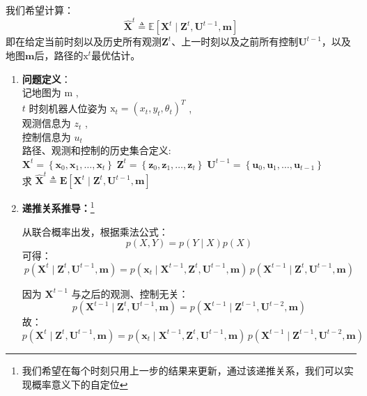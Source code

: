 \documentclass[../main.tex]{subfiles}
\begin{document}
\begin{enumerate}
\begin{enumerate}
            我们希望计算：
        \[
        \widehat{\mathbf{X}}^{t} \triangleq \mathbb{E}\left[ \mathbf{X}^{t} \mid \mathbf{Z}^{t}, \mathbf{U}^{t-1}, \mathbf{m} \right]
        \]
        即在给定当前时刻以及历史所有观测$\mathbf{Z}^{t}$、上一时刻以及之前所有控制$\mathbf{U}^{t-1}$，以及地图$\mathbf{m}$后，路径的$\mathrm{x}^t$最优估计。
        {\small\kaishu 
        \begin{enumerate}
        \item \textbf{问题定义}：\\
        记地图为 \( \mathrm{m} \) ,\\
\( t \) 时刻机器人位姿为 \( \mathrm{x}_{t} = {\left( {x}_{t},{y}_{t},{\theta }_{t}\right) }^{T} \) ,\\观测信息为 \( {z}_{t} \) ,\\控制信息为 \( {u}_{t} \)\\路径、观测和控制的历史集合定义:
\( {\mathbf{X}}^{t} = \left\{  {{\mathbf{x}}_{0},{\mathbf{x}}_{1},\ldots ,{\mathbf{x}}_{t}}\right\}  \;{\mathbf{Z}}^{t} = \left\{  {{\mathbf{z}}_{0},{\mathbf{z}}_{1},\ldots ,{\mathbf{z}}_{t}}\right\}  \;{\mathbf{U}}^{t - 1} = \left\{  {{\mathbf{u}}_{0},{\mathbf{u}}_{1},\ldots ,{\mathbf{u}}_{t - 1}}\right\} \)
\\求 \( {\widehat{\mathbf{X}}}^{t} \triangleq  \mathbf{E}\left\lbrack  {{\mathbf{X}}^{t} \mid  {\mathbf{Z}}^{t},{\mathbf{U}}^{t - 1},\mathbf{m}}\right\rbrack \)
        \item \textbf{递推关系推导：}\footnote{我们希望在每个时刻只用上一步的结果来更新，通过该递推关系，我们可以实现概率意义下的自定位}
        
        从联合概率出发，根据乘法公式：
        \[
        p(X,Y) = p(Y \mid X) p(X)
        \]
        可得：
        \[
        p(\mathbf{X}^{t} \mid \mathbf{Z}^{t}, \mathbf{U}^{t-1}, \mathbf{m})
        = p(\mathbf{x}_t \mid \mathbf{X}^{t-1}, \mathbf{Z}^{t}, \mathbf{U}^{t-1}, \mathbf{m})
        \, p(\mathbf{X}^{t-1} \mid \mathbf{Z}^{t}, \mathbf{U}^{t-1}, \mathbf{m})
        \]
        
        因为 \( \mathbf{X}^{t-1} \) 与之后的观测、控制无关：
        \[
        p(\mathbf{X}^{t-1} \mid \mathbf{Z}^{t}, \mathbf{U}^{t-1}, \mathbf{m})
        = p(\mathbf{X}^{t-1} \mid \mathbf{Z}^{t-1}, \mathbf{U}^{t-2}, \mathbf{m})
        \]
        故：
        \[
        p(\mathbf{X}^{t} \mid \mathbf{Z}^{t}, \mathbf{U}^{t-1}, \mathbf{m})
        = p(\mathbf{x}_t \mid \mathbf{X}^{t-1}, \mathbf{Z}^{t}, \mathbf{U}^{t-1}, \mathbf{m})
        \, p(\mathbf{X}^{t-1} \mid \mathbf{Z}^{t-1}, \mathbf{U}^{t-2}, \mathbf{m})
        \]
        

\end{enumerate}}
\end{enumerate}
\end{enumerate}
\end{document}
